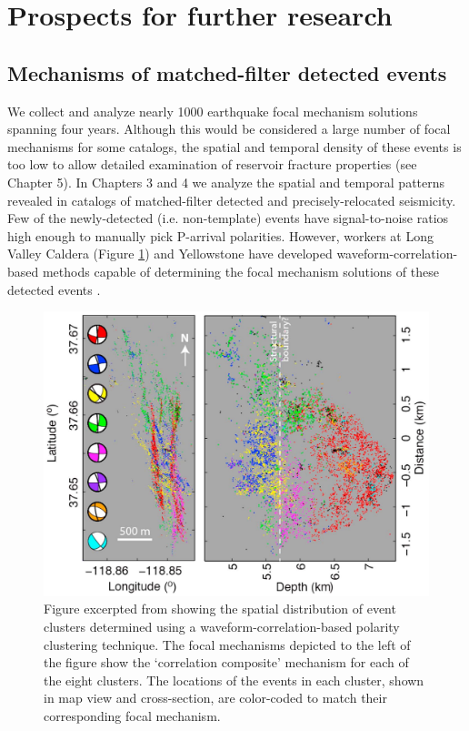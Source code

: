 \section{Prospects for further research}
\subsection{Mechanisms of matched-filter detected events}
We collect and analyze nearly 1000 earthquake focal mechanism solutions spanning four years. Although this would be considered a large number of focal mechanisms for some catalogs, the spatial and temporal density of these events is too low to allow detailed examination of reservoir fracture properties (see Chapter 5). In Chapters 3 and 4 we analyze the spatial and temporal patterns revealed in catalogs of matched-filter detected and precisely-relocated seismicity. Few of the newly-detected (i.e. non-template) events have signal-to-noise ratios high enough to manually pick P-arrival polarities. However, workers at Long Valley Caldera (Figure \ref{shelly2016fig7}) and Yellowstone have developed waveform-correlation-based methods capable of determining the focal mechanism solutions of these detected events \citep{Shelly_2016b,Hotovec_Ellis_2018,shelly2018illuminating}.

\begin{figure}[h!]
\begin{center}
\includegraphics[width=1.00\columnwidth]{Chapter_6_Synthesis/figures/shelly_2016b_fig7/Shelly_2016b_fig7}
\caption[Polarity clustering output excerpted from \citet{Shelly_2016b}]{{
Figure excerpted from \citep{Shelly_2016b} showing the spatial distribution of event clusters determined using a waveform-correlation-based polarity clustering technique. The focal mechanisms depicted to the left of the figure show the `correlation composite' mechanism for each of the eight clusters. The locations of the events in each cluster, shown in map view and cross-section, are color-coded to match their corresponding focal mechanism.
{\label{shelly2016fig7}}%
}}
\end{center}
\end{figure}

